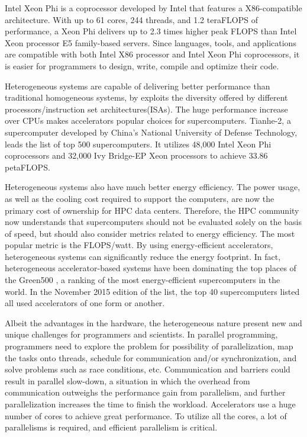 Intel Xeon Phi\cite{Jeffers:2013:IXP:2523262} is a coprocessor developed by Intel that features a 
X86-compatible architecture. With up to 61 cores, 244 threads, 
and 1.2 teraFLOPS of performance, a Xeon Phi delivers up to 2.3 times higher 
peak FLOPS than Intel Xeon processor E5 family-based servers.
Since languages, tools, and applications are compatible with both Intel X86 
processor and Intel Xeon Phi coprocessors, it is easier for programmers to
design, write, compile and optimize their code. 




Heterogeneous systems are capable of delivering better performance than 
traditional homogeneous systems, by exploits the diversity offered by different 
processors/instruction set architectures(ISAs). 
The huge performance increase over CPUs makes accelerators popular choices for
supercomputers. Tianhe-2\cite{Liao2014}, a supercomputer developed by China’s National 
University of Defense Technology, leads the list of top 500 supercomputers\cite{top500-2015-11}.
It utilizes 48,000  Intel Xeon Phi coprocessors and 32,000 Ivy Bridge-EP Xeon 
processors to achieve 33.86 petaFLOPS.

Heterogeneous systems also have much better energy efficiency. 
The power usage, as well as the cooling cost required to support the computers,
are now the primary cost of ownership for HPC data centers. Therefore,
the HPC community now understands that supercomputers should not be evaluated
solely on the basis of speed, but should also consider metrics related to 
energy efficiency. The most popular metric is the FLOPS/watt.
By using energy-efficient accelerators,
heterogeneous systems can significantly reduce the energy footprint. 
In fact, heterogeneous accelerator-based systems have been dominating the 
top places of the Green500 \cite{green500},
a ranking of the most energy-efficient supercomputers in the world. 
In the November 2015 edition of the list\cite{green500-2015-11}, 
the top 40 supercomputers listed all used accelerators of one form or another.

Albeit the advantages in the hardware, the heterogeneous nature present new
and unique challenges for programmers and scientists. 
In parallel programming, programmers need to explore the problem for 
possibility of parallelization, map the tasks onto threads, schedule for
communication and/or synchronization, and solve problems such as race conditions,
etc. Communication and barriers could result in parallel slow-down, 
a situation in which the overhead from communication outweighs the performance 
gain from parallelism, and further parallelization increases the time to finish
the workload. 
Accelerators use a huge number of cores to achieve great performance. 
To utilize all the cores, a lot of parallelisms is required, and efficient 
parallelism is critical. 

